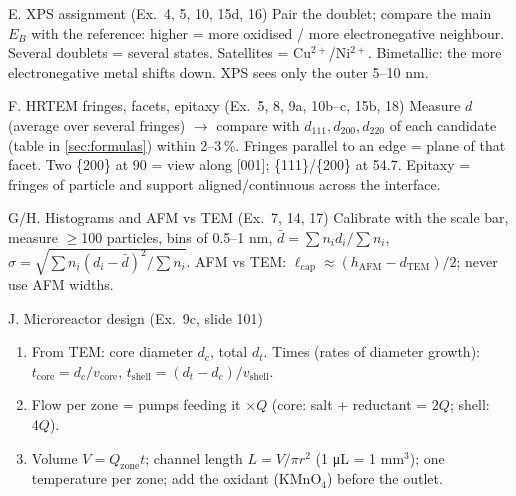 \begin{recipe}{E. XPS assignment (Ex.~4, 5, 10, 15d, 16)}
Pair the doublet; compare the main $E_B$ with the reference: higher = more oxidised / more electronegative neighbour.
Several doublets = several states. Satellites = Cu$^{2+}$/Ni$^{2+}$. Bimetallic: the more electronegative metal shifts down.
XPS sees only the outer 5--10 nm.
\end{recipe}

\begin{recipe}{F. HRTEM fringes, facets, epitaxy (Ex.~5, 8, 9a, 10b--c, 15b, 18)}
Measure $d$ (average over several fringes) $\to$ compare with $d_{111}, d_{200}, d_{220}$ of each candidate (table in
\cref{sec:formulas}) within 2--3\,\%. Fringes parallel to an edge = plane of that facet. Two \{200\} at 90\textdegree{} = view along
[001]; \{111\}/\{200\} at 54.7\textdegree. Epitaxy = fringes of particle and support aligned/continuous across the interface.
\end{recipe}

\begin{recipe}{G/H. Histograms and AFM vs TEM (Ex.~7, 14, 17)}
Calibrate with the scale bar, measure $\geq$100 particles, bins of 0.5--1 nm, $\bar d=\sum n_id_i/\sum n_i$,
$\sigma=\sqrt{\sum n_i(d_i-\bar d)^2/\sum n_i}$. AFM vs TEM: $\ell_\mathrm{cap}\approx(h_\mathrm{AFM}-d_\mathrm{TEM})/2$; never use AFM widths.
\end{recipe}

\begin{recipe}{J. Microreactor design (Ex.~9c, slide 101)}
\begin{enumerate}
  \item From TEM: core diameter $d_c$, total $d_t$. Times (rates of diameter growth): $t_\mathrm{core}=d_c/v_\mathrm{core}$,
        $t_\mathrm{shell}=(d_t-d_c)/v_\mathrm{shell}$.
  \item Flow per zone = pumps feeding it $\times Q$ (core: salt + reductant = $2Q$; shell: $4Q$).
  \item Volume $V = Q_\mathrm{zone}t$; channel length $L = V/\pi r^2$ (1 \si{\micro L} = 1 mm$^3$); one temperature per zone;
        add the oxidant (KMnO$_4$) before the outlet.
\end{enumerate}
\end{recipe}
